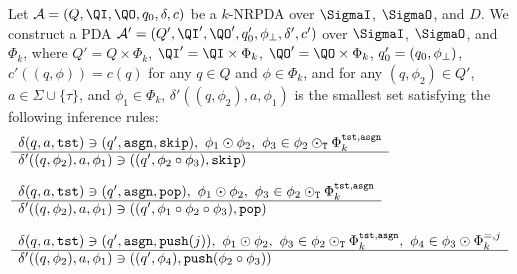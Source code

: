 Let $\calA=(Q,\QI,\QO,q_0,\delta,c)$ be a $k$-NRPDA
over $\SigmaI$, $\SigmaO$, and $D$.
We construct a PDA
$\calA'=(Q',\QI',\QO',q'_0,\phizero,\delta',c')$
over $\SigmaI$, $\SigmaO$, and $\Phi_k$,
where $Q'=Q\times\Phi_k$, $\QI'=\QI\times\Phi_k$, $\QO'=\QO\times\Phi_k$,
$q'_0=(q_0,\phi_{\bot})$,
$c'((q,\phi))=c(q)$ for any $q\in Q$ and $\phi\in\Phi_k$,
and for any $(q,\phi_2)\in Q'$, $a\in\Sigma\cup\{\tau\}$,
and $\phi_1\in\Phi_k$,
$\delta'((q,\phi_2),a,\phi_1)$ is the smallest set
satisfying the following inference rules:
%
\begin{align}
&
\begin{array}{l}
  \delta(q,a,\tst) \ni (q',\asgn,\skip), \
  \phi_1\COMPBL\phi_2, \
  \phi_3\in \phi_2\COMPBLT\Phi_k^{\tst,\asgn}
  \\ \hline
  \delta'((q,\phi_2),a,\phi_1) \ni ((q',\phi_2\COMP\phi_3),\skip)
\end{array}
%
\\[\medskipamount]
&
\begin{array}{l}
  \delta(q,a,\tst) \ni (q',\asgn,\pop), \
  \phi_1\COMPBL\phi_2, \
  \phi_3\in \phi_2\COMPBLT\Phi_k^{\tst,\asgn}
  \\ \hline
  \delta'((q,\phi_2),a,\phi_1) \ni ((q',\phi_1\COMP\phi_2\COMP\phi_3),\pop)
\end{array}
%
\\[\medskipamount]
&
\begin{array}{l}
  \delta(q,a,\tst) \ni (q',\asgn,\push(j)), \
  \phi_1\COMPBL\phi_2, \
  \phi_3\in \phi_2\COMPBLT\Phi_k^{\tst,\asgn}, \
  \phi_4\in \phi_3\COMPBL\Phi_k^{=,j}
  \\ \hline
  \delta'((q,\phi_2),a,\phi_1) \ni ((q',\phi_4),\push(\phi_2\COMP\phi_3))
\end{array}
%
\end{align}

